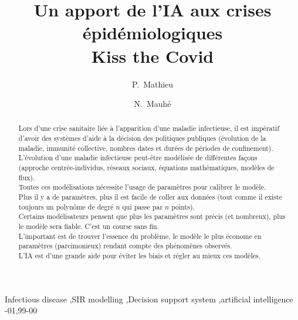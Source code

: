 \documentclass[review]{elsarticle}
\begin{document}
\begin{frontmatter}

\title{Un apport de l’IA aux crises épidémiologiques \\ Kiss the Covid}



\author[cristal]{P.~Mathieu}

\fntext[fn1]{}

\author[cristal]{N.~Mauhé}

\address[cristal]{Univ. Lille, CNRS, Centrale Lille, UMR 9189 --  CRIStAL Lab, F-59000 Lille, France}


\begin{abstract}
  Lors d'une crise sanitaire liée à l'apparition d'une maladie
  infectieuse, il est impératif d'avoir des systèmes d'aide à la
  décision des politiques publiques (évolution de la maladie, immunité
  collective, nombres dates et durées de périodes de
  confinement). \\
  L'évolution d'une maladie infectieuse peut-être modélisée de
  différentes façons (approche centrée-individus, réseaux sociaux,
  équations mathématiques, modèles de flux).\\
  Toutes ces modélisations nécessite l'usage de paramètres pour
  calibrer le modèle.\\
  Plus il y a de paramètres, plus il est facile de coller aux
  données (tout comme il existe toujours un polynôme de degré $n$ qui passe par $n$ points).\\
  Certains modélisateurs pensent que plus les paramètres sont précis
  (et nombreux), plus le modèle sera fiable. C'est un course
  sans fin.\\
  L'important est de trouver l'essence du problème, le modèle le plus
  économe en paramètres (parcimonieux) rendant compte des
  phénomènes observés. \\
  L'IA est d'une grande aide pour éviter les biais et régler au mieux
  ces modèles.
\end{abstract}

\begin{keyword}
Infectious disease \sep SIR modelling \sep Decision support system \sep artificial intelligence
-01\sep  99-00
\end{keyword}

\end{frontmatter}
\end{document}
